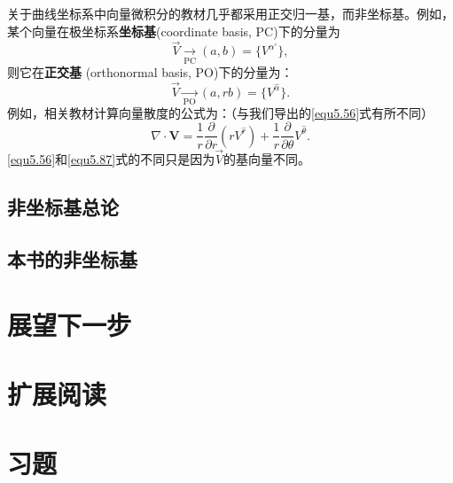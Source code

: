 关于曲线坐标系中向量微积分的教材几乎都采用正交归一基，而非坐标基。例如，某个向量在极坐标系\textbf{坐标基}(coordinate basis, PC)下的分量为
\begin{equation}
    \vec{V} \xrightarrow[\text{PC}]{ } (a, b) = \{ V^{\alpha'} \},
\label{equ5.85}
\end{equation}
则它在\textbf{正交基} (orthonormal basis, PO)下的分量为：
\begin{equation}
    \Vec{V} \xrightarrow[\text{PO}]{ } (a, rb) = \{ V^{\hat{\alpha}} \}.
\label{equ5.86}
\end{equation}
例如，相关教材计算向量散度的公式为：（与我们导出的\eqref{equ5.56}式有所不同）
\begin{equation}
    \nabla \cdot \bm{V} = \frac{1}{r} \frac{\partial}{\partial r} (r V^{\hat{r}}) + \frac{1}{r} \frac{\partial}{\partial \theta} V^{\hat{\theta}}.
\label{equ5.87}
\end{equation}
\eqref{equ5.56}和\eqref{equ5.87}式的不同只是因为$\Vec{V}$的基向量不同。

\subsection*{非坐标基总论}

\subsection*{本书的非坐标基}


\section{展望下一步}
\label{sec5.6}

\section{扩展阅读}
\label{sec5.7}

\section{习题}
\label{sec5.8}